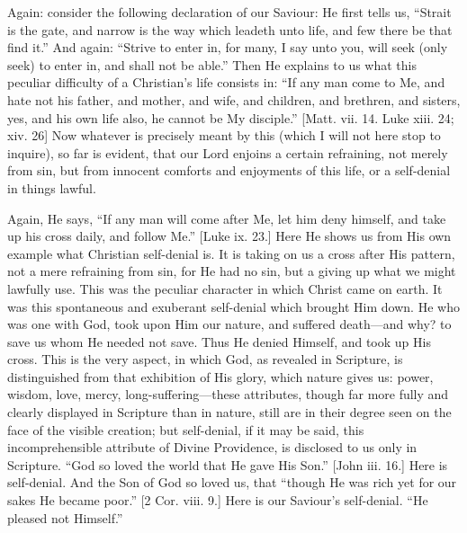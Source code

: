 Again: consider the following declaration of our Saviour: He first
tells us, ``Strait is the gate, and narrow is the way which
leadeth unto life, and few there be that find it.'' And again:
``Strive to enter in, for many, I say unto you, will seek (only
seek) to enter in, and shall not be able.'' Then He explains to us
what this peculiar difficulty of a Christian's life consists in:
``If any man come to Me, and hate not his father, and mother, and
wife, and children, and brethren, and sisters, yes, and his own life
also, he cannot be My disciple.'' [Matt. vii. 14. Luke xiii. 24;
xiv. 26] Now whatever is precisely meant by this (which I will not
here stop to inquire), so far is evident, that our Lord enjoins a
certain refraining, not merely from sin, but from innocent comforts
and enjoyments of this life, or a self-denial in things lawful.

Again, He says, ``If any man will come after Me, let him deny
himself, and take up his cross daily, and follow Me.'' [Luke ix.
23.] Here He shows us from His own example what Christian self-denial
is. It is taking on us a cross after His pattern, not a mere
refraining from sin, for He had no sin, but a giving up what we might
lawfully use. This was the peculiar character in which Christ came on
earth. It was this spontaneous and exuberant self-denial which brought
Him down. He who was one with God, took upon Him our nature, and
suffered death—and why? to save us whom He needed not save. Thus He
denied Himself, and took up His cross. This is the very aspect, in
which God, as revealed in Scripture, is distinguished from that
exhibition of His glory, which nature gives us: power, wisdom, love,
mercy, long-suffering—these attributes, though far more fully and
clearly displayed in Scripture than in nature, still are in their
degree seen on the face of the visible creation; but self-denial, if
it may be said, this incomprehensible attribute of Divine Providence,
is disclosed to us only in Scripture. ``God so loved the world
that He gave His Son.'' [John iii. 16.] Here is self-denial. And
the Son of God so loved us, that ``though He was rich yet for our
sakes He became poor.'' [2 Cor. viii. 9.] Here is our Saviour's
self-denial. ``He pleased not Himself.''

